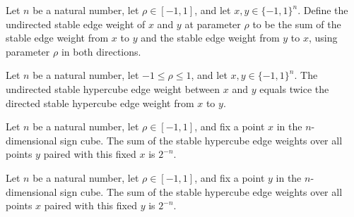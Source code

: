 \begin{definition}
\label{FABL.stableHypercubeUndirectedEdgeWeight}
\leanok
{}
Let $n$ be a natural number, let $\rho \in [-1,1]$, and let $x,y \in \{−1,1\}^n$. Define
the undirected stable edge weight of $x$ and $y$ at parameter $\rho$ to be the sum of
the stable edge weight from $x$ to $y$ and the stable edge weight from $y$ to $x$, using
parameter $\rho$ in both directions.
\end{definition}

\begin{theorem}
\label{FABL.stableHypercubeUndirectedEdgeWeight_eq_two_mul}
\leanok
{}
Let $n$ be a natural number, let $-1\leq \rho\leq 1$, and let $x,y\in\{−1,1\}^n$. The
undirected stable hypercube edge weight between $x$ and $y$ equals twice the directed
stable hypercube edge weight from $x$ to $y$.
\end{theorem}

\begin{theorem}
\label{FABL.sum_stableHypercubeEdgeWeight_outgoing}
\leanok
{}
Let $n$ be a natural number, let $\rho\in[-1,1]$, and fix a point $x$ in the
$n$-dimensional sign cube. The sum of the stable hypercube edge weights over all points
$y$ paired with this fixed $x$ is $2^{-n}$.
\end{theorem}

\begin{theorem}
\label{FABL.sum_stableHypercubeEdgeWeight_incoming}
\leanok
{}
Let $n$ be a natural number, let $\rho\in[-1,1]$, and fix a point $y$ in the
$n$-dimensional sign cube. The sum of the stable hypercube edge weights over all points
$x$ paired with this fixed $y$ is $2^{-n}$.
\end{theorem}


